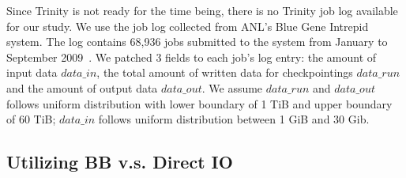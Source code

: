 

Since Trinity is not ready for the time being, there is no Trinity job log available for our study.
We use the job log collected from ANL's Blue Gene Intrepid system. The log contains 68,936 jobs
submitted to the system from January to September 2009~\cite{JobTrace}.
We patched 3 fields to each job's log entry: the amount of input data $data\_in$,
the total amount of written data for checkpointings $data\_run$
and the amount of output data $data\_out$.
We assume $data\_run$ and $data\_out$ follows uniform distribution with
lower boundary of 1 TiB and upper boundary of 60 TiB;
$data\_in$ follows uniform distribution between 1 GiB and 30 Gib.



\subsection{Utilizing BB v.s. Direct IO}
\label{Sec:Sim:DirectIOvsBB}


